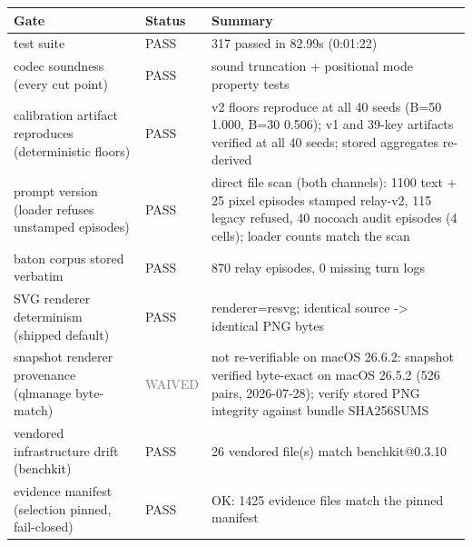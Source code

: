 \begin{tabularx}{\linewidth}{llX}
\toprule
Gate & Status & Summary \\
\midrule
test suite & PASS & 317 passed in 82.99s (0:01:22) \\
codec soundness (every cut point) & PASS & sound truncation + positional mode property tests \\
calibration artifact reproduces (deterministic floors) & PASS & v2 floors reproduce at all 40 seeds (B=50 1.000, B=30 0.506); v1 and 39-key artifacts verified at all 40 seeds; stored aggregates re-derived \\
prompt version (loader refuses unstamped episodes) & PASS & direct file scan (both channels): 1100 text + 25 pixel episodes stamped relay-v2, 115 legacy refused, 40 nocoach audit episodes (4 cells); loader counts match the scan \\
baton corpus stored verbatim & PASS & 870 relay episodes, 0 missing turn logs \\
SVG renderer determinism (shipped default) & PASS & renderer=resvg; identical source -> identical PNG bytes \\
snapshot renderer provenance (qlmanage byte-match) & \textcolor{gray}{WAIVED} & not re-verifiable on macOS 26.6.2: snapshot verified byte-exact on macOS 26.5.2 (526 pairs, 2026-07-28); verify stored PNG integrity against bundle SHA256SUMS \\
vendored infrastructure drift (benchkit) & PASS & 26 vendored file(s) match benchkit@0.3.10 \\
evidence manifest (selection pinned, fail-closed) & PASS & OK: 1425 evidence files match the pinned manifest \\
\bottomrule
\end{tabularx}
